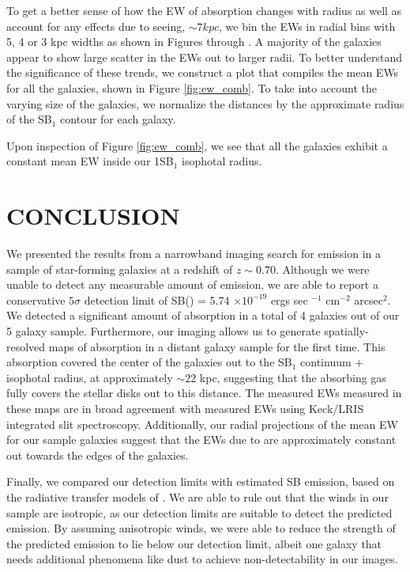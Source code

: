 \documentclass[twocolumn]{aastex61}
\begin{document}
To get a better sense of how the EW of  absorption changes with radius as well as account for any effects due to seeing, $\sim 7 kpc$, we bin the EWs in radial bins with 5, 4 or 3 kpc widths as shown in Figures \label{fig:ew1} through \label{fig:ew5}. A majority of the galaxies appear to show large scatter in the EWs out to larger radii. To better understand the significance of these trends, we construct a plot that compiles the mean EWs for all the galaxies, shown in Figure \ref{fig:ew_comb}. To take into account the varying size of the galaxies, we normalize the distances by the approximate radius of the SB$_1$ contour for each galaxy. 

Upon inspection of Figure \ref{fig:ew_comb}, we see that all the galaxies exhibit a constant mean EW inside our 1SB$_1$ isophotal radius.

\section{CONCLUSION}
We presented the results from a narrowband imaging search for  emission in a sample of star-forming galaxies at a redshift of $z \sim 0.70$.  Although we were unable to detect any measurable amount of  emission, we are able to report a conservative $5\sigma$ detection limit of  SB() = 5.74 $\times 10^{-19}$ ergs sec $^{-1}$ cm$^{-2}$ arcsec$^2$. We detected a significant amount of  absorption in a total of 4 galaxies out of our 5 galaxy sample. Furthermore, our imaging allows us to generate spatially-resolved maps of  absorption in a distant galaxy sample for the first time. This absorption covered the center of the galaxies out to the SB$_1$ continuum +  isophotal radius, at approximately $\sim 22$ kpc, suggesting that the absorbing gas fully covers the stellar disks out to this distance. The measured EWs measured in these maps are in broad agreement with measured EWs using Keck/LRIS integrated slit spectroscopy. Additionally, our radial projections of the mean EW for our sample galaxies suggest that the EWs due to  are approximately constant out towards the edges of the galaxies. 

Finally, we compared our detection limits with estimated SB  emission, based on the radiative transfer models of \cite{Prochaska_2011}. We are able to rule out that the winds in our sample are isotropic, as our detection limits are suitable to detect the predicted emission. By assuming anisotropic winds, we were able to reduce the strength of the predicted emission to lie below our detection limit, albeit one galaxy that needs additional phenomena like dust to achieve non-detectability in our images.
\end{document}
